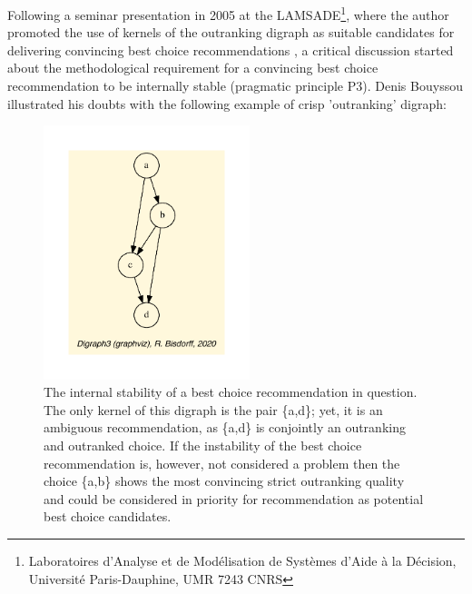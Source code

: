 Following a seminar presentation in 2005 at the LAMSADE\footnote{Laboratoires d'Analyse et de Modélisation de Systèmes d'Aide à la Décision, Université Paris-Dauphine, UMR 7243 CNRS}, where the author promoted the use of kernels of the outranking digraph as suitable candidates for delivering convincing best choice recommendations \citep{BIS-2005}, a critical discussion started about the methodological requirement for a convincing best choice recommendation to be internally stable (pragmatic principle P3). Denis Bouyssou illustrated his doubts with the following example of crisp 'outranking' digraph:
\begin{figure}[h]
\sidecaption[t]
\includegraphics[width=6cm]{Figures/bouyssou11Oct05crisp.pdf}
\caption{The internal stability of a best choice recommendation in question. The only kernel of this digraph is the pair \{a,d\}; yet, it is an ambiguous recommendation, as \{a,d\} is conjointly an outranking and outranked choice. If the instability of the best choice recommendation is, however, not considered a problem then the choice \{a,b\} shows the most convincing strict outranking quality and could be considered in priority for recommendation as potential best choice candidates.}
\label{fig:4.5}       %
\end{figure}


